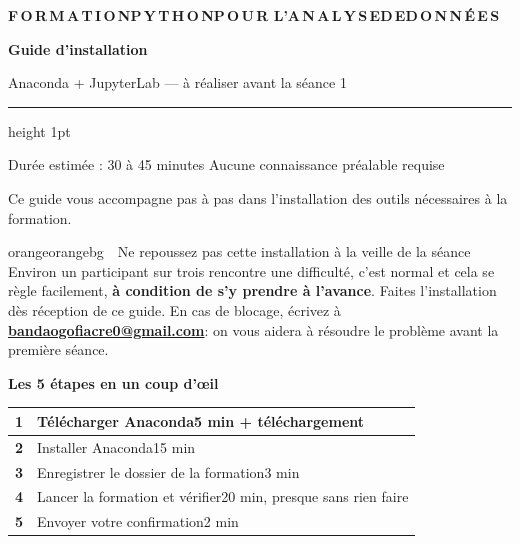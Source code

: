 \documentclass[11pt,a4paper]{article}
\makeatletter
\newcommand{\titrepetit}[1]{%
  \par\vspace{10pt}%
  {\large\bfseries\color{bleuclair}#1}%
  \par\vspace{4pt}}
\newenvironment{attention}[1]{\begin{encadre}{orange}{orangebg}{\ding{110}~~#1}}{\end{encadre}}
\newcommand{\courriel}{bandaogofiacre0@gmail.com}
\newcommand{\adressecontact}{%
  \href{mailto:\courriel}{\textbf{\color{bleuclair}\courriel}}}
\makeatother
\begin{document}
\thispagestyle{couverture}

\noindent\begin{tcolorbox}[enhanced, sharp corners, colback=bleufonce,
  colframe=bleufonce, boxrule=0pt, left=14pt, right=14pt, top=14pt, bottom=14pt,
  before skip=0pt, after skip=16pt]
  {\footnotesize\bfseries\color{bleupale}%
   F\,O\,R\,M\,A\,T\,I\,O\,N\quad P\,Y\,T\,H\,O\,N\quad P\,O\,U\,R\quad
   L'A\,N\,A\,L\,Y\,S\,E\quad D\,E\quad D\,O\,N\,N\,É\,E\,S\par}
  \vspace{10pt}
  {\fontsize{25}{29}\selectfont\bfseries\color{white}Guide d'installation\par}
  \vspace{6pt}
  {\large\color{bleupale}Anaconda + JupyterLab — à réaliser avant la séance 1\par}
  \vspace{10pt}
  {\color{bleuclair}\hrule height 1pt}
  \vspace{8pt}
  {\small\color{bleupale}Durée estimée : 30 à 45 minutes\quad\textbullet\quad
   Aucune connaissance préalable requise\par}
\end{tcolorbox}

\noindent Ce guide vous accompagne pas à pas dans l'installation des outils
nécessaires à la formation.

\begin{attention}{Ne repoussez pas cette installation à la veille de la séance}
Environ un participant sur trois rencontre une difficulté, c'est normal et cela
se règle facilement, \textbf{à condition de s'y prendre à l'avance}. Faites
l'installation dès réception de ce guide. En cas de blocage,
écrivez à \adressecontact : on vous aidera à résoudre le problème avant
la première séance.
\end{attention}

\titrepetit{Les 5 étapes en un coup d'œil}

{\renewcommand{\arraystretch}{1.5}%
\noindent\begin{tabularx}{\textwidth}{@{}p{0.8cm}X@{}}
\hline
\textbf{1} & Télécharger Anaconda\hfill{\small\color{grismoyen}5 min + téléchargement}\\
\hline
\textbf{2} & Installer Anaconda\hfill{\small\color{grismoyen}15 min}\\
\hline
\textbf{3} & Enregistrer le dossier de la formation\hfill{\small\color{grismoyen}3 min}\\
\hline
\textbf{4} & Lancer la formation et vérifier\hfill{\small\color{grismoyen}20 min, presque sans rien faire}\\
\hline
\textbf{5} & Envoyer votre confirmation\hfill{\small\color{grismoyen}2 min}\\
\hline
\end{tabularx}}
\end{document}
